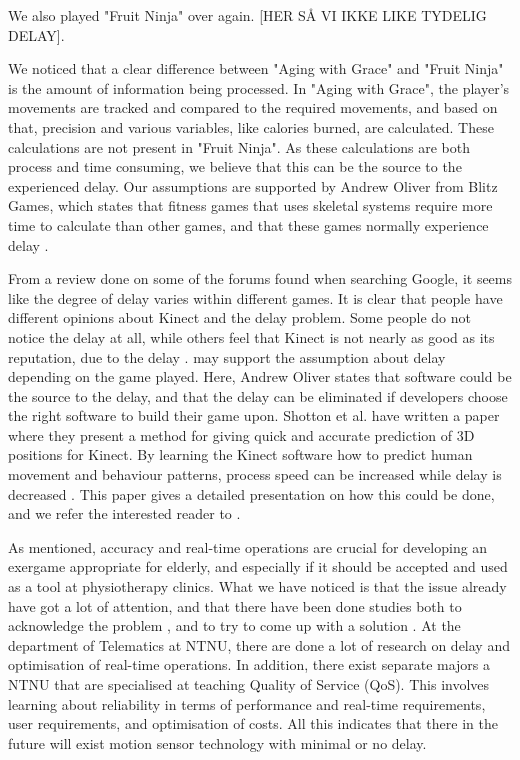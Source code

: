 We also played "Fruit Ninja" over again. [HER SÅ VI IKKE LIKE TYDELIG DELAY].

We noticed that a clear difference between "Aging with Grace" and "Fruit Ninja" is the amount of information being processed. In "Aging with Grace", the player's movements are tracked and compared to the required movements, and based on that, precision and various variables, like calories burned, are calculated. These calculations are not present in "Fruit Ninja". As these calculations are both process and time consuming, we believe that this can be the source to the experienced delay. Our assumptions are supported by Andrew Oliver from Blitz Games, which states that fitness games that uses skeletal systems require more time to calculate than other games, and that these games normally experience delay \cite{kinectLag}. 

From a review done on some of the forums found when searching Google, it seems like the degree of delay varies within different games. It is clear that people have different opinions about Kinect and the delay problem. Some people do not notice the delay at all, while others feel that Kinect is not nearly as good as its reputation, due to the delay \cite{kinectLagForum1} \cite{kinectLagForum2}. \cite{kinectLag} may support the assumption about delay depending on the game played. Here, Andrew Oliver states that software could be the source to the delay, and that the delay can be eliminated if developers choose the right software to build their game upon. Shotton et al. \cite{artikkelKinectLag} have written a paper where they present a method for giving quick and accurate prediction of 3D positions for Kinect. By learning the Kinect software how to predict human movement and behaviour patterns, process speed can be increased while delay is decreased \cite{artikkelKinectLag} \cite{artikkelKinectLagIntro}. This paper gives a detailed presentation on how this could be done, and we refer the interested reader to \cite{artikkelKinectLag}.       

As mentioned, accuracy and real-time operations are crucial for developing an exergame appropriate for elderly, and especially if it should be accepted and used as a tool at physiotherapy clinics. What we have noticed is that the issue already have got a lot of attention, and that there have been done studies both to acknowledge the problem \cite{leyvand2011kinect}, and to try to come up with a solution \cite{artikkelKinectLag}. At the department of Telematics at NTNU, there are done a lot of research on delay and optimisation of real-time operations. In addition, there exist separate majors a NTNU that are specialised at teaching Quality of Service (QoS). This involves learning about reliability in terms of performance and real-time requirements, user requirements, and optimisation of costs. All this indicates that there in the future will exist motion sensor technology with minimal or no delay. 

